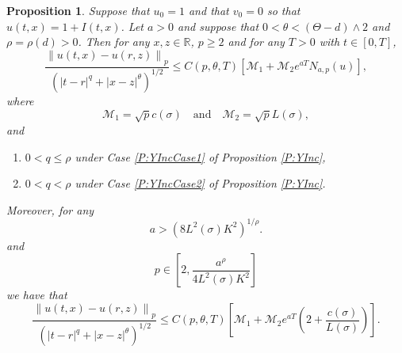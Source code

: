 \documentclass[a4paper,11pt]{article}
\numberwithin{equation}{section}
\theoremstyle{plain}
\newtheorem{proposition}[theorem]{Proposition}
\theoremstyle{definition}
\newcommand{\Norm}[1]{\left\|  #1   \right\|}
\newcommand{\R}{\mathbb{R}}
\numberwithin{NQ}{section}
\numberwithin{LQ}{section}
\numberwithin{ZQ}{section}
\begin{document}
	\begin{proposition}
		\label{P:NormInc}
		Suppose that $u_0=1$ and that $v_0 =0$ so that $u(t,x) = 1 + I(t,x)$. Let $a>0$ and suppose that $0< \theta < (\Theta -d) \wedge 2$ and $\rho = \rho(d) > 0$. Then for any $x,z \in \R$, $p\ge 2$ and for any $T>0$ with $t\in [0,T]$,
		\begin{equation}
		\label{E:NormInc_N(u)}
		\frac{\Norm{u(t,x)-u(r,z)}_p}{\left(|t-r|^{q} + |x-z|^{\theta}\right)^{1/2}} \le 	C(p,\theta, T)\left[ \mathcal{M}_1 + \mathcal{M}_2 e^{aT} N_{a,p}(u)\right] ,
		\end{equation}
		where 
		\[
		\mathcal{M}_1 = \sqrt{p}c(\sigma) \quad \text{and} \quad\mathcal{M}_2 =\sqrt{p}L(\sigma),
		\]
		and
		\begin{enumerate}
			\item $0< q \le \rho$ under Case \ref{P:YIncCase1} of Proposition \ref{P:YInc},
			\item $0 < q < \rho$ under Case \ref{P:YIncCase2} of Proposition \ref{P:YInc}.
		\end{enumerate}
		Moreover, for any 
		\[
		a > \left( 8 L^2(\sigma)K^2\right)^{1/
			\rho}.
		\]
		and 
		\[
		p \in \left[ 2, \frac{a^{\rho}}{4L^2(\sigma)K^2} \right]
		\]
		we have that 
		\begin{equation}
		\label{E:NormInc_cL}
		\frac{\Norm{u(t,x)-u(r,z)}_p}{\left(|t-r|^{q} + |x-z|^{\theta}\right)^{1/2}} \le C(p,\theta, T)\left[ \mathcal{M}_1 + \mathcal{M}_2 e^{aT} \left( 2 +  \frac{c(\sigma)}{L(\sigma)} \right)\right].
		\end{equation}
	\end{proposition}
	
\end{document}

